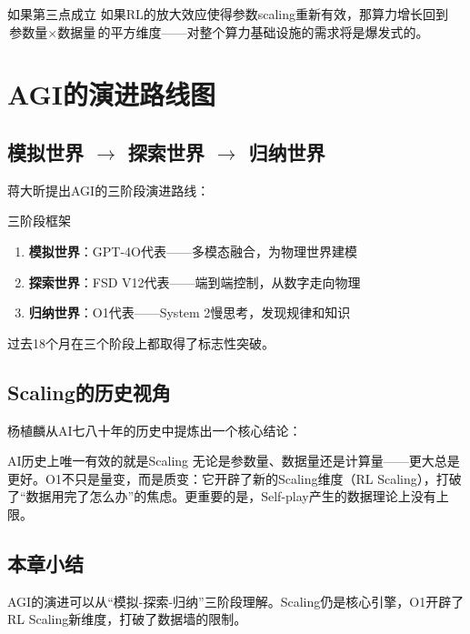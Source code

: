 \documentclass[a4paper]{article}
\begin{document}
\begin{warningbox}{如果第三点成立}
如果RL的放大效应使得参数scaling重新有效，那算力增长回到$\text{参数量} \times \text{数据量}$的平方维度——对整个算力基础设施的需求将是爆发式的。
\end{warningbox}


\section{AGI的演进路线图}

\subsection{模拟世界 $\rightarrow$ 探索世界 $\rightarrow$ 归纳世界}

蒋大昕提出AGI的三阶段演进路线：

\begin{knowledgebox}{三阶段框架}
\begin{enumerate}
\item \textbf{模拟世界}：GPT-4O代表——多模态融合，为物理世界建模
\item \textbf{探索世界}：FSD V12代表——端到端控制，从数字走向物理
\item \textbf{归纳世界}：O1代表——System 2慢思考，发现规律和知识
\end{enumerate}
过去18个月在三个阶段上都取得了标志性突破。
\end{knowledgebox}

\subsection{Scaling的历史视角}

杨植麟从AI七八十年的历史中提炼出一个核心结论：

\begin{importantbox}{AI历史上唯一有效的就是Scaling}
无论是参数量、数据量还是计算量——更大总是更好。O1不只是量变，而是质变：它开辟了新的Scaling维度（RL Scaling），打破了``数据用完了怎么办''的焦虑。更重要的是，Self-play产生的数据理论上没有上限。
\end{importantbox}

\subsection{本章小结}

AGI的演进可以从``模拟-探索-归纳''三阶段理解。Scaling仍是核心引擎，O1开辟了RL Scaling新维度，打破了数据墙的限制。
\end{document}
